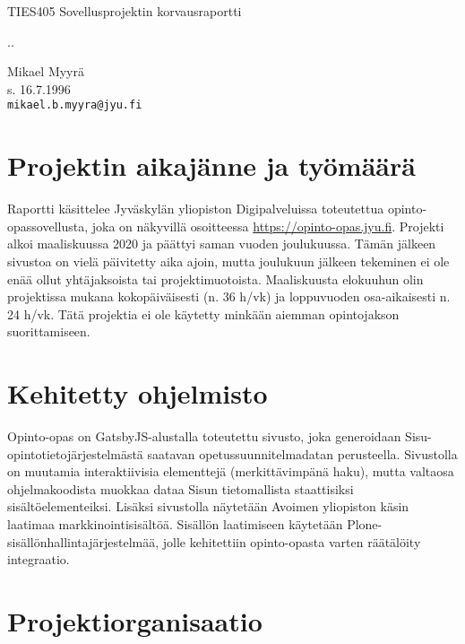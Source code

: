 \documentclass[11pt]{article}
\begin{document}
\begin{center}
\vspace{2cm}
\LARGE
TIES405 Sovellusprojektin korvausraportti

\vspace{10pt}
\large
\number\day.\number\month.\number\year

\vspace{10pt}
Mikael Myyrä \\
s. 16.7.1996\\
\texttt{mikael.b.myyra@jyu.fi}\\
\end{center}
\vspace{10pt}

\section{Projektin aikajänne ja työmäärä}

Raportti käsittelee Jyväskylän yliopiston Digipalveluissa toteutettua
opinto-opassovellusta, joka on näkyvillä osoitteessa
\url{https://opinto-opas.jyu.fi}.  Projekti alkoi maaliskuussa 2020 ja päättyi
saman vuoden joulukuussa. Tämän jälkeen sivustoa on vielä päivitetty aika
ajoin, mutta joulukuun jälkeen tekeminen ei ole enää ollut yhtäjaksoista tai
projektimuotoista. Maaliskuusta elokuuhun olin projektissa mukana
kokopäiväisesti (n. 36 h/vk) ja loppuvuoden osa-aikaisesti n. 24 h/vk. Tätä
projektia ei ole käytetty minkään aiemman opintojakson suorittamiseen.

\section{Kehitetty ohjelmisto}

Opinto-opas on GatsbyJS-alustalla toteutettu sivusto, joka
generoidaan Sisu-opintotieto\-järjestel\-mästä saatavan opetussuunnitelmadatan
perusteella. Sivustolla on muutamia interaktiivisia elementtejä
(merkittävimpänä haku), mutta valtaosa ohjelmakoodista muokkaa dataa Sisun
tieto\-mallis\-ta staattisiksi sisältöelementeiksi. Lisäksi sivustolla näytetään
Avoi\-men yliopiston käsin laatimaa mark\-kinointisisältöä. Sisällön laatimiseen
käytetään Plone-sisällön\-hallintajärjestelmää, jolle kehitettiin opinto-opasta varten
räätälöity integraatio.

\section{Projektiorganisaatio}
\end{document}
